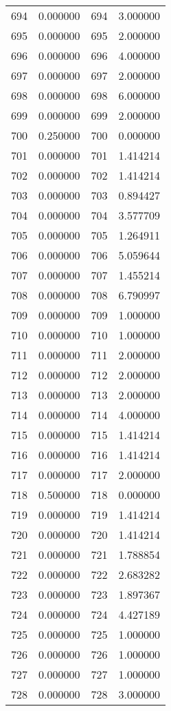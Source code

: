 \documentclass[12pt]{article}
\begin{document}
\begin{longtable}{@{}cccc@{}}
694 & 0.000000 & 694 & 3.000000 \\
695 & 0.000000 & 695 & 2.000000 \\
696 & 0.000000 & 696 & 4.000000 \\
697 & 0.000000 & 697 & 2.000000 \\
698 & 0.000000 & 698 & 6.000000 \\
699 & 0.000000 & 699 & 2.000000 \\
700 & 0.250000 & 700 & 0.000000 \\
701 & 0.000000 & 701 & 1.414214 \\
702 & 0.000000 & 702 & 1.414214 \\
703 & 0.000000 & 703 & 0.894427 \\
704 & 0.000000 & 704 & 3.577709 \\
705 & 0.000000 & 705 & 1.264911 \\
706 & 0.000000 & 706 & 5.059644 \\
707 & 0.000000 & 707 & 1.455214 \\
708 & 0.000000 & 708 & 6.790997 \\
709 & 0.000000 & 709 & 1.000000 \\
710 & 0.000000 & 710 & 1.000000 \\
711 & 0.000000 & 711 & 2.000000 \\
712 & 0.000000 & 712 & 2.000000 \\
713 & 0.000000 & 713 & 2.000000 \\
714 & 0.000000 & 714 & 4.000000 \\
715 & 0.000000 & 715 & 1.414214 \\
716 & 0.000000 & 716 & 1.414214 \\
717 & 0.000000 & 717 & 2.000000 \\
718 & 0.500000 & 718 & 0.000000 \\
719 & 0.000000 & 719 & 1.414214 \\
720 & 0.000000 & 720 & 1.414214 \\
721 & 0.000000 & 721 & 1.788854 \\
722 & 0.000000 & 722 & 2.683282 \\
723 & 0.000000 & 723 & 1.897367 \\
724 & 0.000000 & 724 & 4.427189 \\
725 & 0.000000 & 725 & 1.000000 \\
726 & 0.000000 & 726 & 1.000000 \\
727 & 0.000000 & 727 & 1.000000 \\
728 & 0.000000 & 728 & 3.000000 \\

\end{longtable}
\end{document}
